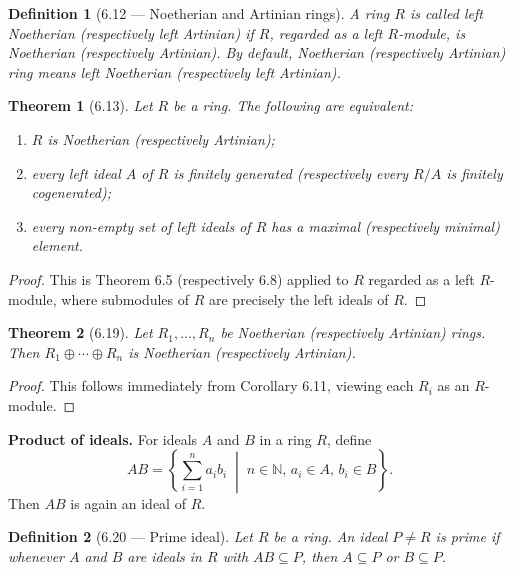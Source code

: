 \documentclass[12pt]{article}
\newtheorem{theorem}{Theorem}
\newtheorem{definition}{Definition}
\begin{document}
\begin{definition}[6.12 — Noetherian and Artinian rings]
A ring $R$ is called \emph{left Noetherian} (respectively \emph{left Artinian}) if $R$, regarded as a left $R$-module, is Noetherian (respectively Artinian). By default, Noetherian (respectively Artinian) ring means left Noetherian (respectively left Artinian).
\end{definition}

\begin{theorem}[6.13]
Let $R$ be a ring. The following are equivalent:
\begin{enumerate}[label=(\roman*)]
  \item $R$ is Noetherian (respectively Artinian);
  \item every left ideal $A$ of $R$ is finitely generated (respectively every $R/A$ is finitely cogenerated);
  \item every non-empty set of left ideals of $R$ has a maximal (respectively minimal) element.
\end{enumerate}
\end{theorem}

\begin{proof}
This is Theorem 6.5 (respectively 6.8) applied to $R$ regarded as a left $R$-module, where submodules of $R$ are precisely the left ideals of $R$.
\end{proof}


\begin{theorem}[6.19]
Let $R_1, \ldots, R_n$ be Noetherian (respectively Artinian) rings. Then $R_1 \oplus \cdots \oplus R_n$ is Noetherian (respectively Artinian).
\end{theorem}

\begin{proof}
This follows immediately from Corollary 6.11, viewing each $R_i$ as an $R$-module.
\end{proof}

\medskip
\noindent\textbf{Product of ideals.} For ideals $A$ and $B$ in a ring $R$, define
\[
  AB = \left\{ \sum_{i=1}^n a_i b_i \;\middle|\; n \in \mathbb{N},\, a_i \in A,\, b_i \in B \right\}.
\]
Then $AB$ is again an ideal of $R$.

\begin{definition}[6.20 — Prime ideal]
Let $R$ be a ring. An ideal $P \neq R$ is \emph{prime} if whenever $A$ and $B$ are ideals in $R$ with $AB \subseteq P$, then $A \subseteq P$ or $B \subseteq P$.
\end{definition}
\end{document}
